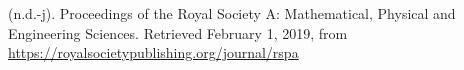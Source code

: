 \documentclass[12pt,twoside]{article}
\begin{document}
{\begin{thebibliography}{222}
\mdbibitemlabel{}(n.d.-j). Proceedings of the Royal Society A: Mathematical, Physical and Engineering Sciences. Retrieved February 1, 2019, from \href{https://royalsocietypublishing.org/journal/rspa}{{\ttfamily https://\hspace{0pt}royalsocietypublishing.\hspace{0pt}org/\hspace{0pt}journal/\hspace{0pt}rspa}}\label{royalsociety_proceedings_nodate}%
\par%
\end{thebibliography}}%
\end{document}
